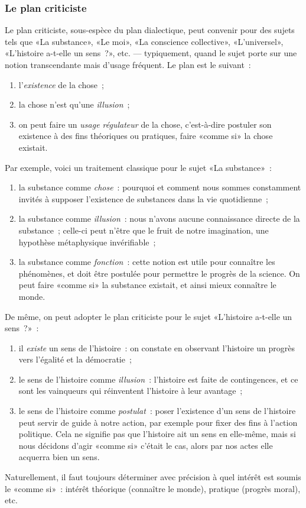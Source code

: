 \documentclass[a4paper,11pt]{article}
\newcommand{\cad}{c'est-à-dire}
\begin{document}
\subsubsection{Le plan criticiste}

Le plan criticiste, sous-espèce du plan dialectique, peut convenir pour
des sujets tels que «La substance», «Le moi», «La conscience
collective», «L'universel», «L'histoire a-t-elle un sens~?», etc. ---
typiquement, quand le sujet porte sur une notion transcendante mais
d'usage fréquent. Le plan est le suivant~:
\begin{enumerate}
\item l'\emph{existence} de la chose~;
\item la chose n'est qu'une \emph{illusion}~;
\item on peut faire un \emph{usage régulateur} de la chose, \cad{}
  postuler son existence à des fins théoriques ou pratiques, faire
  «comme si» la chose existait.
\end{enumerate}
Par exemple, voici un traitement classique pour le sujet «La
substance»~:
\begin{enumerate}
\item la substance comme \emph{chose}~: pourquoi et comment nous sommes
  constamment invités à supposer l'existence de substances dans la vie
  quotidienne~;
\item la substance comme \emph{illusion}~: nous n'avons aucune
  connaissance directe de la substance~; celle-ci peut n'être que le
  fruit de notre imagination, une hypothèse métaphysique invérifiable~;
\item la substance comme \emph{fonction}~: cette notion est utile pour
  connaître les phénomènes, et doit être postulée pour permettre le
  progrès de la science. On peut faire «comme si» la substance existait,
  et ainsi mieux connaître le monde.
\end{enumerate}
De même, on peut adopter le plan criticiste pour le sujet «L'histoire
a-t-elle un sens~?»~:
\begin{enumerate}
\item il \emph{existe} un sens de l'histoire~: on constate en observant
  l'histoire un progrès vers l'égalité et la démocratie~;
\item le sens de l'histoire comme \emph{illusion}~: l'histoire est faite
  de contingences, et ce sont les vainqueurs qui réinventent l'histoire
  à leur avantage~;
\item le sens de l'histoire comme \emph{postulat}~: poser l'existence
  d'un sens de l'histoire peut servir de guide à notre action, par
  exemple pour fixer des fins à l'action politique. Cela ne signifie pas
  que l'histoire ait un sens en elle-même, mais si nous décidons d'agir
  «comme si» c'était le cas, alors par nos actes elle acquerra bien un
  sens.
\end{enumerate}
Naturellement, il faut toujours déterminer avec précision à quel intérêt
est soumis le «comme si»~: intérêt théorique (connaître le monde),
pratique (progrès moral), etc.
\end{document}
